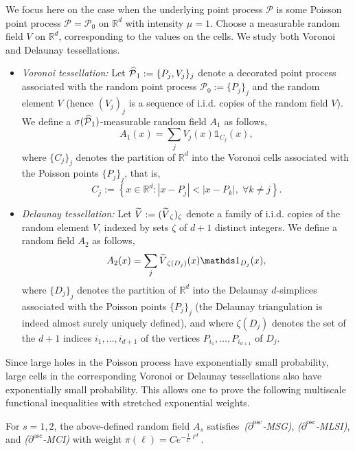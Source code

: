 \documentclass[10pt]{amsart}
\theoremstyle{definition}\newtheorem{defi}[theo]{Definition}\newtheorem{rema}[theo]{Remark}\newtheorem{exam}[theo]{Example}\newtheorem{exem}[theo]{Example}\newtheorem{nota}[theo]{Notation}
\newcommand{\R}{\mathbb R}
\newcommand{\Pc}{\mathcal P}
\newcommand{\osc}{\partial^{\mathrm{osc}}}
\let\oldtilde\tilde
\renewcommand*{\tilde}[1]{\mathchoice{\widetilde{#1}}{\widetilde{#1}}{\oldtilde{#1}}{\oldtilde{#1}}}\let\oldhat\hat
\renewcommand*{\hat}[1]{\mathchoice{\widehat{#1}}{\widehat{#1}}{\oldhat{#1}}{\oldhat{#1}}}\let\oldexists\exists
\renewcommand*{\exists}{\mathrel{\oldexists}}
\let\oldforall\forall
\renewcommand*{\forall}{\mathrel{\oldforall}}
\begin{document}
We focus here on the case when the underlying point process $\Pc$ is some Poisson point process $\Pc=\Pc_0$ on $\R^d$ with intensity $\mu=1$. Choose a measurable random field $V$ on $\R^d$, corresponding to the values on the cells. We study both Voronoi and Delaunay tessellations.
\begin{itemize}
\item \emph{Voronoi tessellation:} Let $\hat\Pc_1:=\{P_j,V_j\}_j$ denote a decorated point process associated with the random point process $\Pc_0:=\{P_j\}_j$ and the random element $V$ (hence $(V_j)_j$ is a sequence of i.i.d. copies of the random field $V$). We define a $\sigma(\hat\Pc_1)$-measurable random field $A_1$ as follows,
\[
A_1(x)=\sum_jV_j(x)\mathds1_{C_j}(x),
\]
where $\{C_j\}_j$ denotes the partition of $\R^d$ into the Voronoi cells associated with the Poisson points $\{P_j\}_j$, that is,
\[
C_j:=\left\{x\in\R^d:|x-P_j|<|x-P_k|,\;\forall k\ne j\right\}.
\]
\item \emph{Delaunay tessellation:} Let $\tilde V:=(\tilde V_\zeta)_\zeta$ denote a family of i.i.d. copies of the random element $V$, indexed by sets $\zeta$ of $d+1$ distinct integers. We define a random field $A_2$ as follows,
\[
A_2(x)=\sum_j \tilde V_{\zeta(D_j)}(x)\mathds1_{D_j}(x),
\]
where $\{D_j\}_j$ denotes the partition of $\R^d$ into the Delaunay $d$-simplices associated with the Poisson points $\{P_j\}_j$ (the Delaunay triangulation is indeed almost surely uniquely defined), and where $\zeta(D_j)$ denotes the set of the $d+1$ indices $i_1,\dots,i_{d+1}$ of the vertices $P_{i_1},\dots,P_{i_{d+1}}$ of $D_j$.
\end{itemize}

Since large holes in the Poisson process have exponentially small probability, large cells in the corresponding Voronoi or Delaunay tessellations also have exponentially small probability. This allows one to prove the following multiscale functional \linebreak inequalities with stretched exponential weights.

\begin{prop}\label{prop:voronoi}
For $s=1,2$, the above-defined random field $A_s$ satisfies~\emph{($\osc$-MSG)}, \emph{($\osc$-MLSI)}, and \emph{($\osc$-MCI)} with weight $\pi(\ell)=Ce^{-\frac1C\ell^d}$.
\end{prop}
\end{document}
